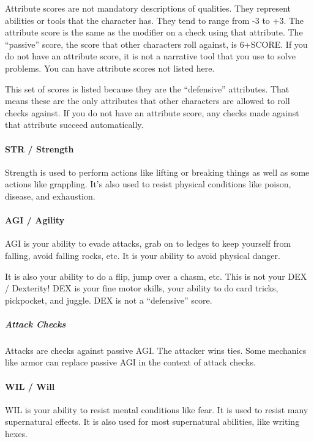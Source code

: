 \documentclass[
  letterpaper,
  DIV=11,
  numbers=noendperiod]{scrartcl}
\let\oldparagraph\paragraph
\renewcommand{\paragraph}[1]{\oldparagraph{#1}\mbox{}}
\let\oldsubparagraph\subparagraph
\renewcommand{\subparagraph}[1]{\oldsubparagraph{#1}\mbox{}}
\begin{document}
Attribute scores are not mandatory descriptions of qualities. They
represent abilities or tools that the character has. They tend to range
from -3 to +3. The attribute score is the same as the modifier on a
check using that attribute. The ``passive'' score, the score that other
characters roll against, is 6+SCORE. If you do not have an attribute
score, it is not a narrative tool that you use to solve problems. You
can have attribute scores not listed here.

This set of scores is listed because they are the ``defensive''
attributes. That means these are the only attributes that other
characters are allowed to roll checks against. If you do not have an
attribute score, any checks made against that attribute succeed
automatically.

\paragraph{STR / Strength}\label{str-strength}

Strength is used to perform actions like lifting or breaking things as
well as some actions like grappling. It's also used to resist physical
conditions like poison, disease, and exhaustion.

\paragraph{AGI / Agility}\label{agi-agility}

AGI is your ability to evade attacks, grab on to ledges to keep yourself
from falling, avoid falling rocks, etc. It is your ability to avoid
physical danger.

It is also your ability to do a flip, jump over a chasm, etc. This is
not your DEX / Dexterity! DEX is your fine motor skills, your ability to
do card tricks, pickpocket, and juggle. DEX is not a ``defensive''
score.

\subparagraph{Attack Checks}\label{attack-checks}

Attacks are checks against passive AGI. The attacker wins ties. Some
mechanics like armor can replace passive AGI in the context of attack
checks.

\paragraph{WIL / Will}\label{wil-will}

WIL is your ability to resist mental conditions like fear. It is used to
resist many supernatural effects. It is also used for most supernatural
abilities, like writing hexes.
\end{document}
